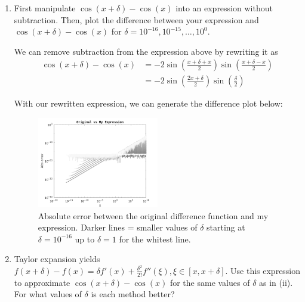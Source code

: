 \documentclass[a4paper,10pt]{article}
\begin{document}
\begin{enumerate}[label = \arabic*.)]
\begin{enumerate}[label = \roman*.]
                \item First manipulate $\cos(x + \delta) - \cos(x)$ into an expression without subtraction. Then, plot the difference between your expression and $\cos(x + \delta) - \cos(x)$ for $\delta = 10^{-16}, 10^{-15}, \ldots, 10^{0}$.
                
                We can remove subtraction from the expression above by rewriting it as
                \begin{align*}
                    \cos(x + \delta) - \cos(x) &= -2\sin\left(\frac{x + \delta + x}{2}\right)\sin\left(\frac{x + \delta - x}{2}\right) \\
                    &= -2\sin\left(\frac{2x + \delta}{2}\right) \sin\left(\frac{\delta}{2}\right)
                \end{align*}
                
                With our rewritten expression, we can generate the difference plot below:
                \begin{figure}[h!]
                    \centering
                    \includegraphics[width=0.5\textwidth]{images/3.iii.png}
                    \caption{Absolute error between the original difference function and my expression. Darker lines = smaller values of $ \delta $ starting at $ \delta = 10^{-16} $ up to $ \delta = 1 $ for the whitest line.}
                \end{figure}
                
                \item Taylor expansion yields $f(x + \delta) - f(x) = \delta f'(x) + \frac{\delta^2}{2!}f''(\xi), \xi \in [x, x+\delta].$ Use this expression to approximate $\cos(x + \delta) - \cos(x)$  for the same values of $\delta$ as in (ii). For what values of $\delta$ is each method better?
                
                \newpage
                

\end{enumerate}
\end{enumerate}
\end{document}
